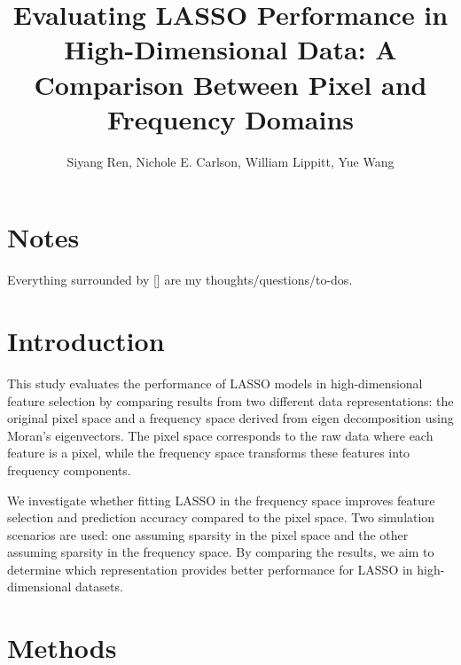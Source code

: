\documentclass[12pt]{article}
\begin{document}
\title{Evaluating LASSO Performance in High-Dimensional Data: A Comparison Between Pixel and Frequency Domains}
\author{Siyang Ren, Nichole E. Carlson, William Lippitt, Yue Wang}
\date{}
\maketitle


\section*{Notes}

Everything surrounded by [] are my thoughts/questions/to-dos.


\section*{Introduction}

This study evaluates the performance of LASSO models in high-dimensional feature selection by comparing results from two different data representations: the original pixel space and a frequency space derived from eigen decomposition using Moran’s eigenvectors. The pixel space corresponds to the raw data where each feature is a pixel, while the frequency space transforms these features into frequency components.

We investigate whether fitting LASSO in the frequency space improves feature selection and prediction accuracy compared to the pixel space. Two simulation scenarios are used: one assuming sparsity in the pixel space and the other assuming sparsity in the frequency space. By comparing the results, we aim to determine which representation provides better performance for LASSO in high-dimensional datasets.


\section*{Methods}
\end{document}
